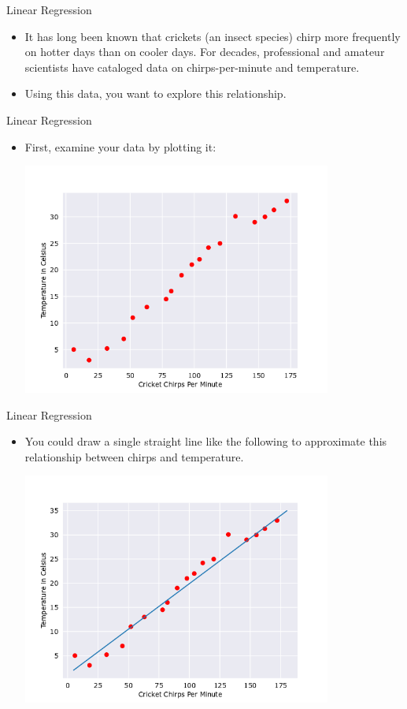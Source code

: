 \documentclass{beamer}
\begin{document}
\begin{frame}{Linear Regression}
\begin{itemize}
    \item It has long been known that crickets (an insect species) chirp more frequently on hotter days than on cooler days. For decades, professional and amateur scientists have cataloged data on chirps-per-minute and temperature. 
    
    \item Using this data, you want to explore this relationship.
\end{itemize}
\end{frame}

\begin{frame}{Linear Regression}
\begin{itemize}
    \item First, examine your data by plotting it:
    
    \includegraphics[width=0.8\textwidth]{images/CricketPoints.png}
    
\end{itemize}
\end{frame}

\begin{frame}{Linear Regression}
\begin{itemize}
    \item You could draw a single straight line like the following to approximate this relationship between chirps and temperature.

    \includegraphics[width=0.8\textwidth]{images/CricketLine.png}
    
\end{itemize}
\end{frame}
\end{document}

